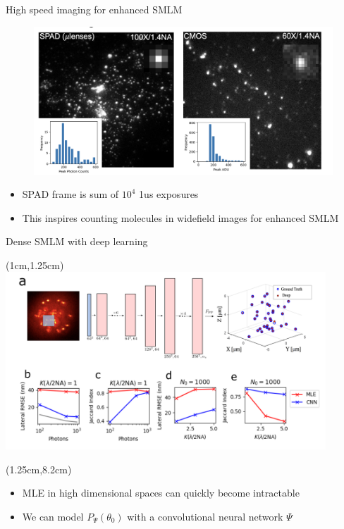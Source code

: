 \documentclass{beamer}					%
\begin{document}
\begin{frame}{High speed imaging for enhanced SMLM}
\begin{figure}
\includegraphics[width=\textwidth]{SPADvCMOS.png}
\end{figure}
\begin{itemize}
\item SPAD frame is sum of $10^{4}$ 1us exposures
\item This inspires counting molecules in widefield images for enhanced SMLM
\end{itemize}
\end{frame}


\begin{frame}{Dense SMLM with deep learning}

\begin{textblock*}{12cm}(1cm,1.25cm)
\includegraphics[width=12cm]{PSF2D.png}
\end{textblock*}
\begin{textblock*}{12cm}(1.25cm,8.2cm)
\begin{itemize}
\item MLE in high dimensional spaces can quickly become intractable
\item We can model $P_{\Psi}(\theta_{0})$ with a convolutional neural network $\Psi$
\end{itemize}
\end{textblock*}

\end{frame}
\end{document}
